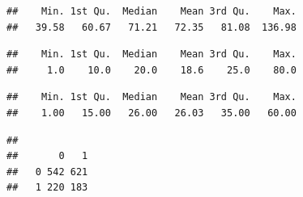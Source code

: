 \documentclass[
  10pt,
]{book}
\newenvironment{Shaded}{\begin{snugshade}}{\end{snugshade}}
\newcommand{\DecValTok}[1]{\textcolor[rgb]{0.00,0.00,0.81}{#1}}
\newcommand{\KeywordTok}[1]{\textcolor[rgb]{0.13,0.29,0.53}{\textbf{#1}}}
\newcommand{\NormalTok}[1]{#1}
\newcommand{\OperatorTok}[1]{\textcolor[rgb]{0.81,0.36,0.00}{\textbf{#1}}}
\newcommand{\StringTok}[1]{\textcolor[rgb]{0.31,0.60,0.02}{#1}}
\begin{document}
\begin{verbatim}
##    Min. 1st Qu.  Median    Mean 3rd Qu.    Max. 
##   39.58   60.67   71.21   72.35   81.08  136.98
\end{verbatim}

\begin{Shaded}
\end{Shaded}

\begin{verbatim}
##    Min. 1st Qu.  Median    Mean 3rd Qu.    Max. 
##     1.0    10.0    20.0    18.6    25.0    80.0
\end{verbatim}

\begin{Shaded}
\end{Shaded}

\begin{verbatim}
##    Min. 1st Qu.  Median    Mean 3rd Qu.    Max. 
##    1.00   15.00   26.00   26.03   35.00   60.00
\end{verbatim}

\begin{Shaded}
\end{Shaded}

\begin{verbatim}
##    
##       0   1
##   0 542 621
##   1 220 183
\end{verbatim}

\begin{Shaded}
\end{Shaded}
\end{document}
